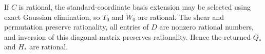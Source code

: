If \(C\) is rational, the standard-coordinate basis extension may be selected using exact Gaussian elimination, so \(T_0\) and \(W_0\) are rational. The shear and permutation preserve rationality, all entries of \(D\) are nonzero rational numbers, and inversion of this diagonal matrix preserves rationality. Hence the returned \(Q_*\) and \(H_*\) are rational.